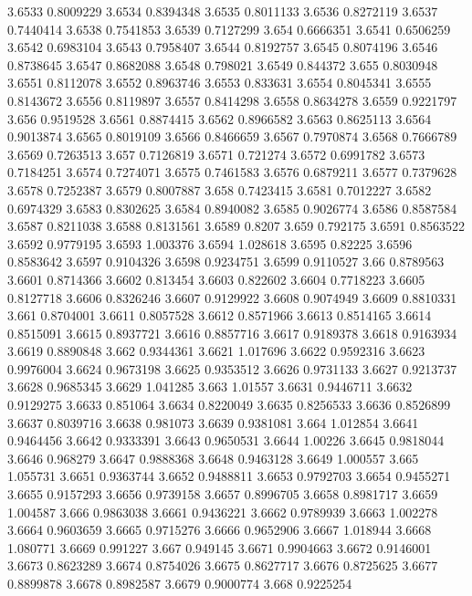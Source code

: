 3.6533  0.8009229
3.6534  0.8394348
3.6535  0.8011133
3.6536  0.8272119
3.6537  0.7440414
3.6538  0.7541853
3.6539  0.7127299
3.654  0.6666351
3.6541  0.6506259
3.6542  0.6983104
3.6543  0.7958407
3.6544  0.8192757
3.6545  0.8074196
3.6546  0.8738645
3.6547  0.8682088
3.6548  0.798021
3.6549  0.844372
3.655  0.8030948
3.6551  0.8112078
3.6552  0.8963746
3.6553  0.833631
3.6554  0.8045341
3.6555  0.8143672
3.6556  0.8119897
3.6557  0.8414298
3.6558  0.8634278
3.6559  0.9221797
3.656  0.9519528
3.6561  0.8874415
3.6562  0.8966582
3.6563  0.8625113
3.6564  0.9013874
3.6565  0.8019109
3.6566  0.8466659
3.6567  0.7970874
3.6568  0.7666789
3.6569  0.7263513
3.657  0.7126819
3.6571  0.721274
3.6572  0.6991782
3.6573  0.7184251
3.6574  0.7274071
3.6575  0.7461583
3.6576  0.6879211
3.6577  0.7379628
3.6578  0.7252387
3.6579  0.8007887
3.658  0.7423415
3.6581  0.7012227
3.6582  0.6974329
3.6583  0.8302625
3.6584  0.8940082
3.6585  0.9026774
3.6586  0.8587584
3.6587  0.8211038
3.6588  0.8131561
3.6589  0.8207
3.659  0.792175
3.6591  0.8563522
3.6592  0.9779195
3.6593  1.003376
3.6594  1.028618
3.6595  0.82225
3.6596  0.8583642
3.6597  0.9104326
3.6598  0.9234751
3.6599  0.9110527
3.66  0.8789563
3.6601  0.8714366
3.6602  0.813454
3.6603  0.822602
3.6604  0.7718223
3.6605  0.8127718
3.6606  0.8326246
3.6607  0.9129922
3.6608  0.9074949
3.6609  0.8810331
3.661  0.8704001
3.6611  0.8057528
3.6612  0.8571966
3.6613  0.8514165
3.6614  0.8515091
3.6615  0.8937721
3.6616  0.8857716
3.6617  0.9189378
3.6618  0.9163934
3.6619  0.8890848
3.662  0.9344361
3.6621  1.017696
3.6622  0.9592316
3.6623  0.9976004
3.6624  0.9673198
3.6625  0.9353512
3.6626  0.9731133
3.6627  0.9213737
3.6628  0.9685345
3.6629  1.041285
3.663  1.01557
3.6631  0.9446711
3.6632  0.9129275
3.6633  0.851064
3.6634  0.8220049
3.6635  0.8256533
3.6636  0.8526899
3.6637  0.8039716
3.6638  0.981073
3.6639  0.9381081
3.664  1.012854
3.6641  0.9464456
3.6642  0.9333391
3.6643  0.9650531
3.6644  1.00226
3.6645  0.9818044
3.6646  0.968279
3.6647  0.9888368
3.6648  0.9463128
3.6649  1.000557
3.665  1.055731
3.6651  0.9363744
3.6652  0.9488811
3.6653  0.9792703
3.6654  0.9455271
3.6655  0.9157293
3.6656  0.9739158
3.6657  0.8996705
3.6658  0.8981717
3.6659  1.004587
3.666  0.9863038
3.6661  0.9436221
3.6662  0.9789939
3.6663  1.002278
3.6664  0.9603659
3.6665  0.9715276
3.6666  0.9652906
3.6667  1.018944
3.6668  1.080771
3.6669  0.991227
3.667  0.949145
3.6671  0.9904663
3.6672  0.9146001
3.6673  0.8623289
3.6674  0.8754026
3.6675  0.8627717
3.6676  0.8725625
3.6677  0.8899878
3.6678  0.8982587
3.6679  0.9000774
3.668  0.9225254
